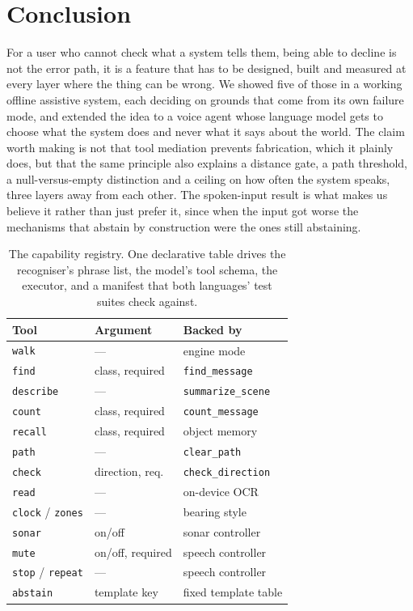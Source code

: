 \documentclass[sigconf,nonacm]{acmart}
\newcommand{\tool}[1]{\texttt{#1}}
\begin{document}
\section{Conclusion}

For a user who cannot check what a system tells them, being able to decline is
not the error path, it is a feature that has to be designed, built and measured
at every layer where the thing can be wrong. We showed five of those in a
working offline assistive system, each deciding on grounds that come from its
own failure mode, and extended the idea to a voice agent whose language model
gets to choose what the system does and never what it says about the world. The
claim worth making is not that tool mediation prevents fabrication, which it
plainly does, but that the same principle also explains a distance gate, a path
threshold, a null-versus-empty distinction and a ceiling on how often the system
speaks, three layers away from each other. The spoken-input result is what makes
us believe it rather than just prefer it, since when the input got worse the
mechanisms that abstain by construction were the ones still abstaining.

\begin{table}[t]
\caption{The capability registry. One declarative table drives the recogniser's
phrase list, the model's tool schema, the executor, and a manifest that both
languages' test suites check against.}
\label{tab:registry}
\small
\begin{tabular}{llp{2.9cm}}
\toprule
Tool & Argument & Backed by \\
\midrule
\tool{walk}     & ---              & engine mode \\
\tool{find}     & class, required  & \tool{find\_message} \\
\tool{describe} & ---              & \tool{summarize\_scene} \\
\tool{count}    & class, required  & \tool{count\_message} \\
\tool{recall}   & class, required  & object memory \\
\tool{path}     & ---              & \tool{clear\_path} \\
\tool{check}    & direction, req.  & \tool{check\_direction} \\
\tool{read}     & ---              & on-device OCR \\
\tool{clock} / \tool{zones} & ---  & bearing style \\
\tool{sonar}    & on/off           & sonar controller \\
\tool{mute}     & on/off, required & speech controller \\
\tool{stop} / \tool{repeat} & ---  & speech controller \\
\midrule
\tool{abstain}  & template key     & fixed template table \\
\bottomrule
\end{tabular}
\end{table}



\end{document}
